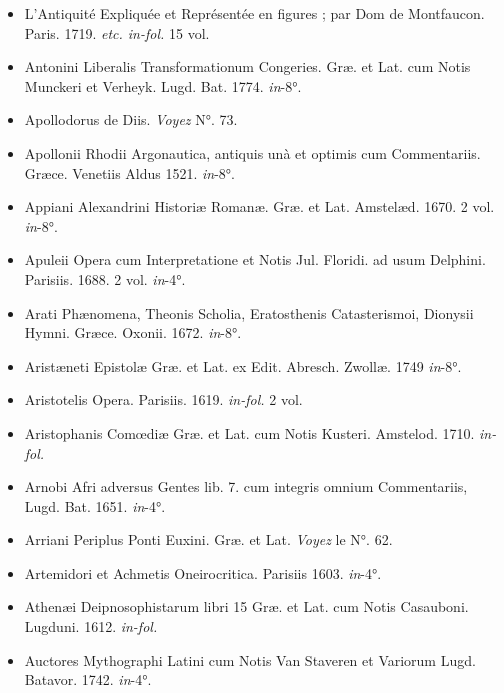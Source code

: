 \documentclass[a4paper, 18pt, oneside]{article}
\begin{document}
\begin{itemize}
    \item L'Antiquité Expliquée et Représentée en figures ; par Dom de Montfaucon. Paris. 1719. \emph{etc. in-fol.} 15 vol.

    \item Antonini Liberalis Transformationum Congeries. Græ. et Lat. cum Notis Munckeri et Verheyk. Lugd. Bat. 1774. \emph{in}-8°.

    \item Apollodorus de Diis. \emph{Voyez} N°. 73.

    \item Apollonii Rhodii Argonautica, antiquis unà et optimis cum Commentariis. Græce. Venetiis Aldus 1521. \emph{in}-8°.

    \item Appiani Alexandrini Historiæ Romanæ. Græ. et Lat. Amstelæd. 1670. 2 vol. \emph{in}-8°.

    \item Apuleii Opera cum Interpretatione et Notis Jul. Floridi. ad usum Delphini. Parisiis. 1688. 2 vol. \emph{in}-4°.

    \item Arati Phænomena, Theonis Scholia, Eratosthenis Catasterismoi, Dionysii Hymni. Græce. Oxonii. 1672. \emph{in}-8°.

    \item Aristæneti Epistolæ Græ. et Lat. ex Edit. Abresch. Zwollæ. 1749 \emph{in}-8°.

    \item Aristotelis Opera. Parisiis. 1619. \emph{in-fol.} 2 vol.

    \item Aristophanis Comœdiæ Græ. et Lat. cum Notis Kusteri. Amstelod. 1710. \emph{in-fol.}

    \item Arnobi Afri adversus Gentes lib. 7. cum integris omnium Commentariis, Lugd. Bat. 1651. \emph{in}-4°.

    \item Arriani Periplus Ponti Euxini. Græ. et Lat. \emph{Voyez} le N°. 62.

    \item Artemidori et Achmetis Oneirocritica. Parisiis 1603. \emph{in}-4°.

    \item Athenæi Deipnosophistarum libri 15 Græ. et Lat. cum Notis Casauboni. Lugduni. 1612. \emph{in-fol.}

    \item Auctores Mythographi Latini cum Notis Van Staveren et Variorum Lugd. Batavor. 1742. \emph{in}-4°.


\end{itemize}
\end{document}
